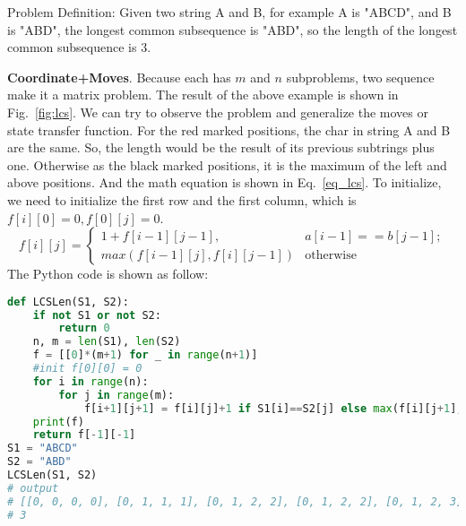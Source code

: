 \documentclass[../main.tex]{subfiles}
\begin{document}
Problem Definition: Given two string A and B, for example A is "ABCD", and B is "ABD", the longest common subsequence is "ABD", so the length of the longest common subsequence is $3$.



\textbf{Coordinate+Moves}. Because each has $m$ and $n$ subproblems, two sequence make it a matrix problem. The result of the above example is shown in Fig.~\ref{fig:lcs}. We can try to observe the problem and generalize the moves or state transfer function. For the red marked positions, the char in string A and B are the same. So, the length would be the result of its previous subtrings plus one. Otherwise as the black marked positions, it is the maximum of the left and above positions. And the math equation is shown in Eq.~\ref{eq_lcs}.  To initialize, we need to initialize the first row and the first column, which is $f[i][0] = 0, f[0][j] = 0$. 
\begin{equation}
\label{eq_lcs}
    f[i][j] = \begin{cases}
    1 + f[i-1][j-1],& a[i-1] == b[j-1];\\
    max(f[i-1][j], f[i][j-1])& \text{otherwise}
    \end{cases}
\end{equation}
The Python code is shown as follow:
\begin{lstlisting}[language = Python]
def LCSLen(S1, S2):
    if not S1 or not S2:
        return 0
    n, m = len(S1), len(S2)
    f = [[0]*(m+1) for _ in range(n+1)]
    #init f[0][0] = 0
    for i in range(n):
        for j in range(m):
            f[i+1][j+1] = f[i][j]+1 if S1[i]==S2[j] else max(f[i][j+1], f[i+1][j])
    print(f)
    return f[-1][-1]
S1 = "ABCD"
S2 = "ABD"
LCSLen(S1, S2)
# output
# [[0, 0, 0, 0], [0, 1, 1, 1], [0, 1, 2, 2], [0, 1, 2, 2], [0, 1, 2, 3]]
# 3
\end{lstlisting}
\end{document}
